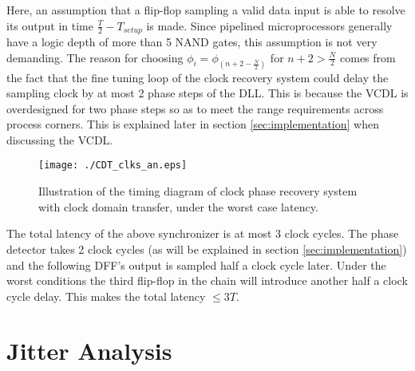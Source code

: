 \documentclass[journal,twoside,letterpaper]{IEEEtran}
\begin{document}
Here, an assumption that a flip-flop sampling a valid
data input is able to resolve its output in time
$\frac{T}{2}-T_{setup}$ is made. Since pipelined
microprocessors generally have a logic depth of more than 
5 NAND gates, this assumption is not very demanding.
The reason for choosing $\phi _i = \phi _{(n+2 - \frac{N}{2})}$
for $n+2 > \frac{N}{2}$ comes from the fact that the
fine tuning loop of the clock recovery
system could delay the sampling clock by at most
2 phase steps of the DLL. This is because the VCDL 
is overdesigned for two phase steps so as to meet the 
range requirements across process corners.
This is explained later in section \ref{sec:implementation} when discussing the VCDL.
\begin{figure}[h!]
\centering
{}
\texttt{[image: ./CDT\_clks\_an.eps]}
\caption{Illustration of the timing diagram of clock phase recovery system
with clock domain transfer, under the worst case
latency.}
\label{fig:cdt_ck_an}
\end{figure}
The total latency of the above synchronizer is
at most 3 clock cycles. The phase detector takes 2
clock cycles (as will be explained in section \ref{sec:implementation})
 and the following DFF's
output is sampled half a clock cycle later.
Under the worst conditions the third flip-flop 
in the chain will introduce another
half a clock cycle delay. This makes the
total latency $\leq 3T$.

\section{Jitter Analysis}
\label{sec:jitter}
\end{document}
